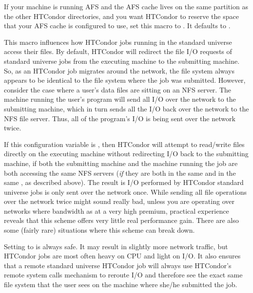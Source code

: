 \begin{description}
\label{param:ReserveAfsCache}
\item[\Macro{RESERVE\_AFS\_CACHE}]
  If your machine is running AFS and the AFS cache lives on the same
  partition as the other HTCondor directories, and you want HTCondor to
  reserve the space that your AFS cache is configured to use, set this
  macro to .  It defaults to .
  
\label{param:UseNfs}
\item[\Macro{USE\_NFS}]
  This macro influences
  how HTCondor jobs running in the standard universe access their
  files.  By default, HTCondor will redirect the file I/O requests
  of standard universe jobs from the executing machine to the submitting
  machine.  So, as an HTCondor job migrates around
  the network, the file system always appears to be identical to the
  file system where the job was submitted.  However, consider the case
  where a user's data files are sitting on an NFS server. The machine
  running the user's program will send all I/O over the network to the
  submitting machine, which in turn sends all the I/O back
  over the network to the NFS file server. Thus,
  all of the program's I/O is being sent over the network twice.
  
  If this configuration variable is , 
  then HTCondor will attempt to read/write files directly on the 
  executing machine without redirecting I/O back to the submitting
  machine, if both the submitting machine and the machine running the job
  are both accessing the same NFS servers (\emph{if} they are both in the
  same  and in the same ,
  as described above).  The result is I/O performed by HTCondor standard
  universe jobs is only sent over the network once.  
  While sending all file operations over the network twice might sound
  really bad, unless you are operating over networks where bandwidth
  as at a very high premium, practical experience reveals that this
  scheme offers very little real performance gain.  There are also
  some (fairly rare) situations where this scheme can break down.
  
  Setting  to  is always safe.  It may result
  in slightly more network traffic, but HTCondor jobs are most often heavy
  on CPU and light on I/O.  It also ensures that a remote
  standard universe HTCondor job will always use HTCondor's remote system
  calls mechanism to reroute I/O and therefore see the exact same
  file system that the user sees on the machine where she/he submitted
  the job.
  

\end{description}
